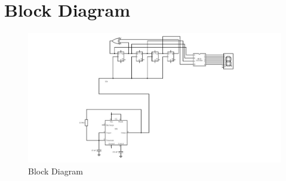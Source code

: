\documentclass{article}
\begin{document}
\section{Block Diagram}
\begin{figure}[ht]
        \centering
        \includegraphics[width=0.8\linewidth]{blockdiag.jpg}
        \caption{Block Diagram}
        \label{fig:view}
\end{figure}
\end{document}
